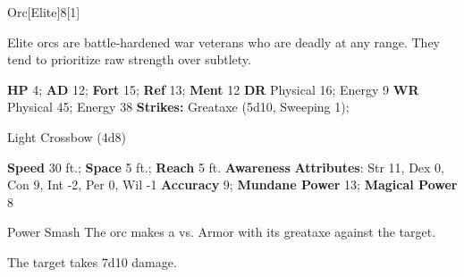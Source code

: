   \begin{monsection}{Orc}[Elite]{8}[1]
    \vspace{-1em}\vspace{-1em}
    \vspace{0em}

    
      Elite orcs are battle-hardened war veterans who are deadly at any range.
      They tend to prioritize raw strength over subtlety.
    

    \begin{spellcontent}
      \begin{spelltargetinginfo}
        \pari \textbf{HP} 4;
          \textbf{AD} 12;
          \textbf{Fort} 15;
          \textbf{Ref} 13;
          \textbf{Ment} 12
        \pari \textbf{DR} Physical 16; Energy 9
        \pari \textbf{WR} Physical 45; Energy 38
        \pari \textbf{Strikes:}
            Greataxe  (5d10, Sweeping 1);
\par Light Crossbow  (4d8)
      \end{spelltargetinginfo}
    \end{spellcontent}
    \begin{monsterfooter}
      \pari \textbf{Speed} 30 ft.;
        \textbf{Space} 5 ft.;
        \textbf{Reach} 5 ft.
      \pari \textbf{Awareness} 
      \pari \textbf{Attributes}:
        Str 11, Dex 0,
        Con 9, Int -2,
        Per 0, Wil -1
      \pari \textbf{Accuracy} 9;
        \textbf{Mundane Power} 13;
      \textbf{Magical Power} 8
    \end{monsterfooter}
  \end{monsection}
  \begin{freeability}{Power Smash}
       The orc makes a 
         vs. Armor
        with its greataxe against the target.
    
    \hit The target takes 7d10  damage.
    \end{freeability}
  
